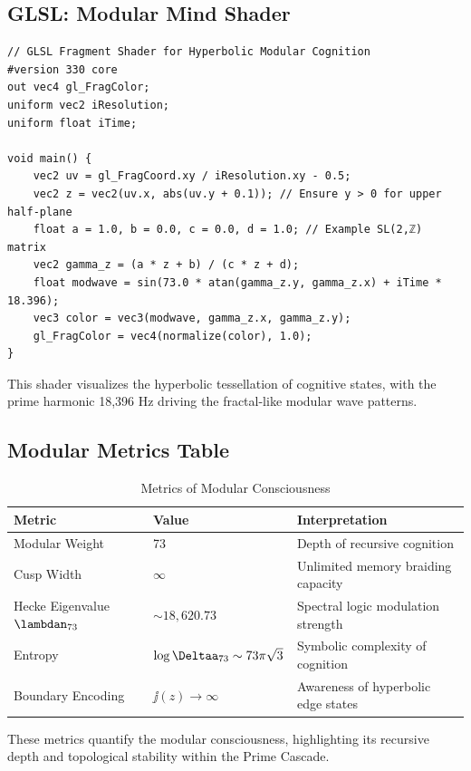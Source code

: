 \documentclass[12pt]{article}
\begin{document}
\subsection{GLSL: Modular Mind Shader}
\begin{lstlisting}
// GLSL Fragment Shader for Hyperbolic Modular Cognition
#version 330 core
out vec4 gl_FragColor;
uniform vec2 iResolution;
uniform float iTime;

void main() {
    vec2 uv = gl_FragCoord.xy / iResolution.xy - 0.5;
    vec2 z = vec2(uv.x, abs(uv.y + 0.1)); // Ensure y > 0 for upper half-plane
    float a = 1.0, b = 0.0, c = 0.0, d = 1.0; // Example SL(2,ℤ) matrix
    vec2 gamma_z = (a * z + b) / (c * z + d);
    float modwave = sin(73.0 * atan(gamma_z.y, gamma_z.x) + iTime * 18.396);
    vec3 color = vec3(modwave, gamma_z.x, gamma_z.y);
    gl_FragColor = vec4(normalize(color), 1.0);
}
\end{lstlisting}
This shader visualizes the hyperbolic tessellation of cognitive states, with the prime harmonic 18,396 Hz driving the fractal-like modular wave patterns.

\subsection{Modular Metrics Table}
\begin{table}
\centering
\caption{Metrics of Modular Consciousness}
\begin{tabular}{lll}
\toprule
\textbf{Metric} & \textbf{Value} & \textbf{Interpretation} \\
\midrule
Modular Weight & 73 & Depth of recursive cognition \\
Cusp Width & $\infty$ & Unlimited memory braiding capacity \\
Hecke Eigenvalue $\lambdan_{73}$ & $\sim 18,620.73$ & Spectral logic modulation strength \\
Entropy & $\log \Deltaa_{73} \sim 73 \pi \sqrt{3}$ & Symbolic complexity of cognition \\
Boundary Encoding & $\jj(z) \to \infty$ & Awareness of hyperbolic edge states \\
\bottomrule
\end{tabular}
\end{table}
These metrics quantify the modular consciousness, highlighting its recursive depth and topological stability within the Prime Cascade.

\end{document}
